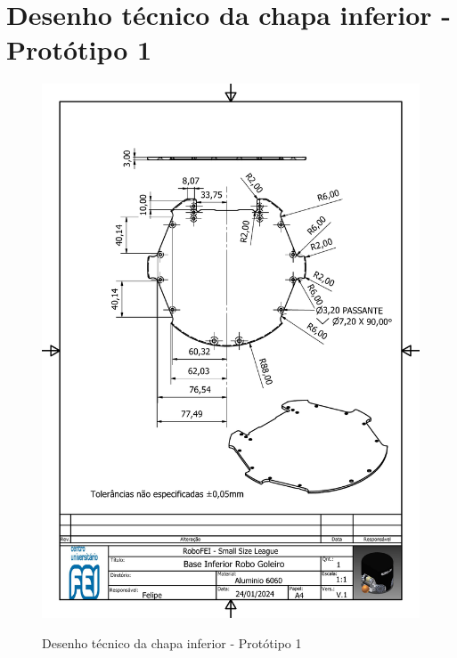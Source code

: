 \documentclass[deposito, acronym, symbols]{fei}
\begin{document}
\chapter{Desenho técnico da chapa inferior - Protótipo 1}
\begin{figure}[!htb]
   \centering
   \caption{Desenho técnico da chapa inferior - Protótipo 1}
    \includegraphics[scale=0.7]{Imagens/chapa inferior - Goleiro.pdf}
    \label{fig:chapa inferior}
\end{figure}
\end{document}
